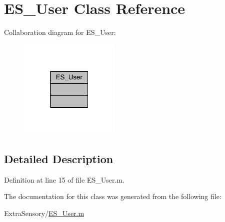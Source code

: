 \hypertarget{class_e_s___user}{\section{E\+S\+\_\+\+User Class Reference}
\label{class_e_s___user}
}


Collaboration diagram for E\+S\+\_\+\+User\+:\nopagebreak
\begin{figure}[H]
\begin{center}
\leavevmode
\includegraphics[width=136pt]{df/d0b/class_e_s___user__coll__graph}
\end{center}
\end{figure}


\subsection{Detailed Description}


Definition at line 15 of file E\+S\+\_\+\+User.\+m.



The documentation for this class was generated from the following file\+:\begin{DoxyCompactItemize}
\item 
Extra\+Sensory/\hyperlink{_e_s___user_8m}{E\+S\+\_\+\+User.\+m}\end{DoxyCompactItemize}

